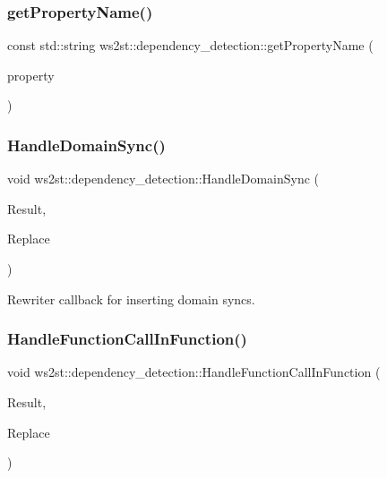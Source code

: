 \subsubsection{\texorpdfstring{get\+Property\+Name()}{getPropertyName()}}
{\footnotesize\ttfamily const std\+::string ws2st\+::dependency\+\_\+detection\+::get\+Property\+Name (\begin{DoxyParamCaption}\item[{\mbox{\hyperlink{namespacews2st_1_1dependency__detection_abcddd986f080a9e5c494edfad3c3faf7}{Property\+List}}}]{property }\end{DoxyParamCaption})}

\mbox{\label{namespacews2st_1_1dependency__detection_aa7e279bcb7d4659203bc4055d7c783c1}} 
\subsubsection{\texorpdfstring{Handle\+Domain\+Sync()}{HandleDomainSync()}}
{\footnotesize\ttfamily void ws2st\+::dependency\+\_\+detection\+::\+Handle\+Domain\+Sync (\begin{DoxyParamCaption}\item[{const Match\+Finder\+::\+Match\+Result \&}]{Result,  }\item[{Replacements \&}]{Replace }\end{DoxyParamCaption})}



Rewriter callback for inserting domain syncs. 

\mbox{\label{namespacews2st_1_1dependency__detection_a38357d8dfb24ccbc3e38b73868bcdaec}} 
\subsubsection{\texorpdfstring{Handle\+Function\+Call\+In\+Function()}{HandleFunctionCallInFunction()}}
{\footnotesize\ttfamily void ws2st\+::dependency\+\_\+detection\+::\+Handle\+Function\+Call\+In\+Function (\begin{DoxyParamCaption}\item[{const Match\+Finder\+::\+Match\+Result \&}]{Result,  }\item[{Replacements \&}]{Replace }\end{DoxyParamCaption})}

